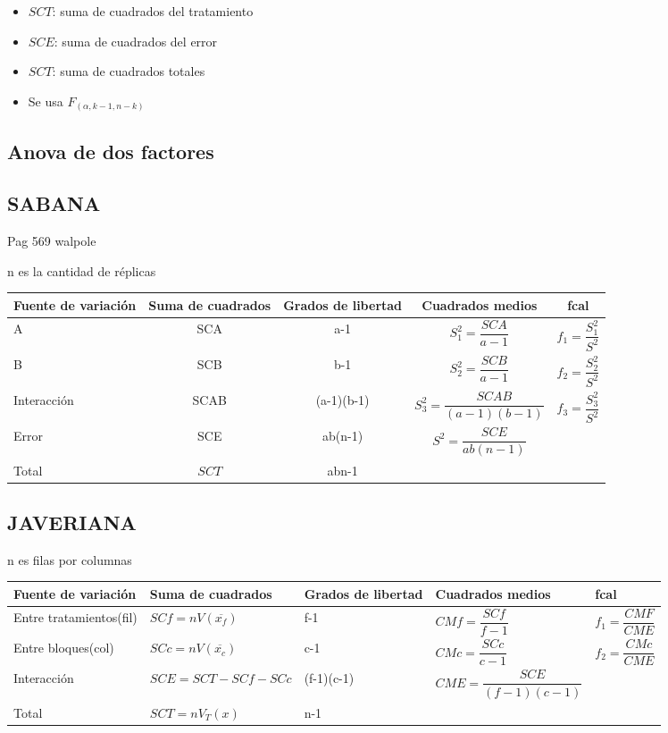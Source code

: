 \begin{itemize}
	\item $SCT$: suma de cuadrados del tratamiento
	\item $SCE$: suma de cuadrados del error
	\item $SCT$: suma de cuadrados totales
	\item Se usa $F_{(\alpha,k-1,n-k)}$
\end{itemize}


\subsection{Anova de dos factores}

\subsection{SABANA}
Pag 569 walpole

n es la cantidad de réplicas

\begin{tabular}{lcccc}
	\hline
	Fuente de variación & Suma de cuadrados & Grados de libertad & Cuadrados medios & fcal\\
	\hline
	A & SCA & a-1 & $S_1^2=\dfrac{SCA}{a-1}$ & $f_1=\dfrac{S_1^2}{S^2}$\\
	B & SCB & b-1 & $S_2^2=\dfrac{SCB}{a-1}$ & $f_2=\dfrac{S_2^2}{S^2}$\\
	Interacción & SCAB & (a-1)(b-1) & $S_3^2=\dfrac{SCAB}{(a-1)(b-1)}$ & $f_3=\dfrac{S_3^2}{S^2}$\\
	Error & SCE & ab(n-1) & $S^2=\dfrac{SCE}{ab(n-1)}$ \\
	\hline
	\hline
	Total & $SCT$ & abn-1
\end{tabular}

\subsection{JAVERIANA}

n es filas por columnas

\begin{tabular}{p{2cm}p{3cm}p{2cm}p{4cm}p{2cm}}
	\hline
	Fuente de variación & Suma de cuadrados & Grados de libertad & Cuadrados medios & fcal\\
	\hline
	Entre tratamientos(fil) & $SCf=nV(\overline{x_f})$ & f-1 & $CMf=\dfrac{SCf}{f-1}$ & $f_1=\dfrac{CMF}{CME}$\\
	Entre bloques(col) & $SCc=nV(\overline{x_c})$ & c-1 & $CMc=\dfrac{SCc}{c-1}$ & $f_2=\dfrac{CMc}{CME}$\\
	Interacción & $SCE=SCT-SCf-SCc$ & (f-1)(c-1) & $CME=\dfrac{SCE}{(f-1)(c-1)}$ \\
	\hline
	\hline
	Total & $SCT=nV_T(x)$ & n-1
\end{tabular}



